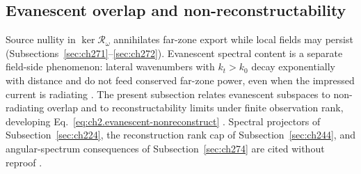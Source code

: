 \subsection{Evanescent overlap and non-reconstructability}
\label{sec:ch273}
Source nullity in $\ker\mathcal{R}_\omega$ annihilates far-zone export while local fields may
persist (Subsections~\ref{sec:ch271}--\ref{sec:ch272}). Evanescent spectral content is a
separate field-side phenomenon: lateral wavenumbers with $k_t>k_0$ decay exponentially with
distance and do not feed conserved far-zone power, even when the impressed current is radiating
\cite{stratton1941,hansen1988}. The present subsection relates evanescent subspaces to
non-radiating overlap and to reconstructability limits under finite observation rank, developing
Eq.~\eqref{eq:ch2.evanescent-nonreconstruct} \cite{stratton1941}. Spectral projectors of
Subsection~\ref{sec:ch224}, the reconstruction rank cap of Subsection~\ref{sec:ch244}, and
angular-spectrum consequences of Subsection~\ref{sec:ch274} are cited without reproof
\cite{harrington2001}.

